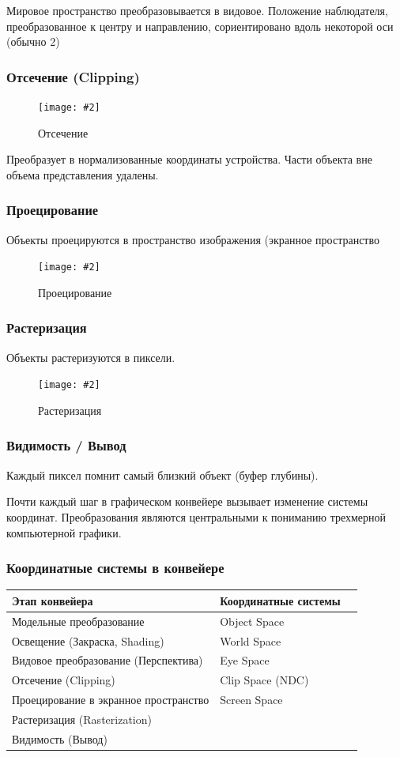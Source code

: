 \documentclass[a4paper, 14pt]{extarticle}
\newcommand{\screenshot}[3]{
	\begin{figure}[h]
		\centering
		\texttt{[image: \#2]}
		\caption{#3}
	\end{figure}
}
\begin{document}
Мировое пространство преобразовывается в видовое.
Положение наблюдателя, преобразованное к центру и направлению, сориентировано вдоль некоторой оси (обычно 2)

\subsubsection{Отсечение (Clipping)}
\screenshot{width=9cm}{l5/S030.jpg}{Отсечение}
Преобразует в нормализованные координаты устройства. Части объекта вне объема представления удалены.

\subsubsection{Проецирование}
Объекты проецируются в пространство изображения (экранное пространство
\screenshot{width=9cm}{l5/S031.jpg}{Проецирование}

\subsubsection{Растеризация}
Объекты растеризуются в пиксели.
\screenshot{width=12cm}{l5/S032.jpg}{Растеризация}

\subsubsection{Видимость / Вывод}
Каждый пиксел помнит самый близкий объект (буфер глубины).

Почти каждый шаг в графическом конвейере вызывает изменение системы координат. Преобразования являются центральными к пониманию трехмерной компьютерной графики.

\subsubsection{Координатные системы в конвейере}
\begin{tabular}{|l|l|l|}
	\hline
	\textbf{Этап конвейера} & \textbf{Координатные системы} \\
	\hline
	Модельные преобразование & Object Space \\
	\hline
	Освещение (Закраска, Shading) & World Space \\
	\hline
	Видовое преобразование (Перспектива) & Eye Space \\
	\hline
	Отсечение (Clipping) & Clip Space (NDC)\\
	\hline
	Проецирование в экранное пространство & Screen Space\\
	\hline
	Растеризация (Rasterization) &\\
	\hline
	Видимость (Вывод) & \\
	\hline
\end{tabular}
\end{document}
